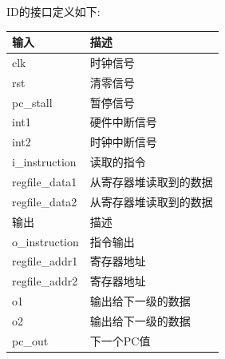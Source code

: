 \documentclass[10pt]{article}
\begin{document}
\begin{CJK}{UTF8}{gbsn}
ID的接口定义如下:\\
\begin{center}
\begin{tabular}{|l|l|}\hline
输入& 描述\\\hline
clk	&时钟信号\\\hline
rst	&清零信号\\\hline
pc\_stall &暂停信号\\\hline
int1 &硬件中断信号\\\hline
int2 &时钟中断信号\\\hline
i\_instruction	&读取的指令\\\hline
regfile\_data1 &从寄存器堆读取到的数据\\\hline
regfile\_data2 &从寄存器堆读取到的数据\\\hline\hline
输出&描述\\\hline
o\_instruction &指令输出\\\hline
regfile\_addr1 &寄存器地址\\\hline
regfile\_addr2 &寄存器地址\\\hline
o1 &输出给下一级的数据\\\hline
o2 &输出给下一级的数据\\\hline
pc\_out&下一个PC值\\\hline
\end{tabular}
\end{center}


\end{CJK}
\end{document}
